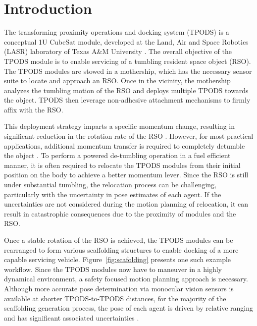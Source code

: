 \section{Introduction}
The transforming proximity operations and docking system (TPODS) is a conceptual 1U CubeSat module, developed at the Land, Air and Space Robotics (LASR) laboratory of Texas A\&M University \cite{TPODS_system,TPODS_estm,TPODS_GNC24}. The overall objective of the TPODS module is to enable servicing of a tumbling resident space object (RSO). The TPODS modules are stowed in a mothership, which has the necessary sensor suite to locate and approach an RSO. Once in the vicinity, the mothership analyzes the tumbling motion of the RSO and deploys multiple TPODS towards the object. TPODS then leverage non-adhesive attachment mechanisms to firmly affix with the RSO. 

This deployment strategy imparts a specific momentum change, resulting in significant reduction in the rotation rate of the RSO \cite{GNC_24_down}. However, for most practical applications, additional momentum transfer is required to completely detumble the object \cite{TPODS_detumble}. To perform a powered de-tumbling operation in a fuel efficient manner, it is often required to relocate the TPODS modules from their initial position on the body to achieve a better momentum lever. Since the RSO is still under substantial tumbling, the relocation process can be challenging, particularly with the uncertainty in pose estimates of each agent. If the uncertainties are not considered during the motion planning of relocation, it can result in catastrophic consequences due to the proximity of modules and the RSO. 

Once a stable rotation of the RSO is achieved, the TPODS modules can be rearranged to form various scaffolding structures to enable docking of a more capable servicing vehicle. Figure~\ref{fig:scafolding} presents one such example workflow. Since the TPODS modules now have to maneuver in a highly dynamical environment, a safety focused motion planning approach is necessary. Although more accurate pose determination via monocular vision sensors is available at shorter TPODS-to-TPODS distances, for the majority of the scaffolding generation process, the pose of each agent is driven by relative ranging and has significant associated uncertainties \cite{ICRA25,Ali_GNC24}. 

